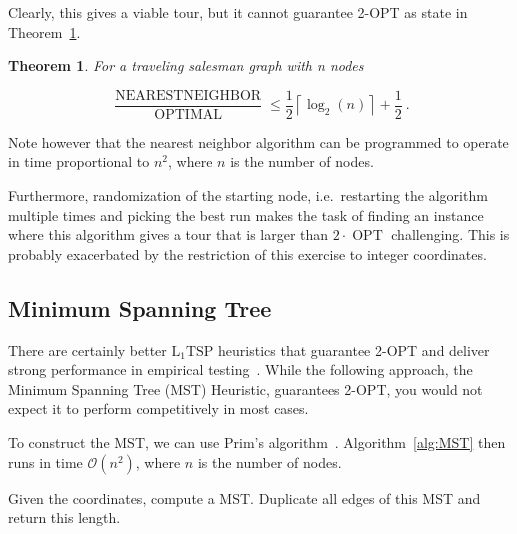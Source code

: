 \documentclass[a4paper,12pt,headsepline]{scrartcl}
\newtheorem{theorem}{Theorem}
\begin{document}
    Clearly, this gives a viable tour, but it cannot guarantee 2-OPT as \citet{rosenkrantz_heur} state in Theorem~\ref{thm:NearestNeighbor}.

    \begin{theorem}
        For a traveling salesman graph with n nodes

        $$
        \frac{\operatorname{NEARESTNEIGHBOR}}{\operatorname{OPTIMAL}} \leq \frac{1}{2} \left\lceil \log_2 (n) \right\rceil + \frac{1}{2}~.
        $$
        \label{thm:NearestNeighbor}
    \end{theorem}
    Note however that the nearest neighbor algorithm can be programmed to operate in time proportional to $n^2$, where $n$ is the number of nodes.
    
    Furthermore, randomization of the starting node, i.e.\ restarting the algorithm multiple times and picking the best run makes the task of finding an instance where this algorithm gives a tour that is larger than $2 \cdot \operatorname{OPT}$ challenging.
    This is probably exacerbated by the restriction of this exercise to integer coordinates.
    
    
    \subsection{Minimum Spanning Tree}\label{sec:FFI_MST}
    There are certainly better $\operatorname{L_1 TSP}$ heuristics that guarantee 2-OPT and deliver strong performance in empirical testing~\citep{ALLISON1984195}.
    While the following approach, the Minimum Spanning Tree (MST) Heuristic, guarantees 2-OPT, you would not expect it to perform competitively in most cases.
    
    To construct the MST, we can use Prim's algorithm~\citep{prim_MST}.
    Algorithm~\ref{alg:MST} then runs in time $\mathcal{O}(n^2)$, where $n$ is the number of nodes.

    \begin{algorithm}
    \caption{Minimum Spanning Tree}
        \begin{algorithmic}[1]
            \State Given the coordinates, compute a MST.
            \State Duplicate all edges of this MST and return this length.
        \end{algorithmic}
        \label{alg:MST}
    \end{algorithm}
    
\end{document}
